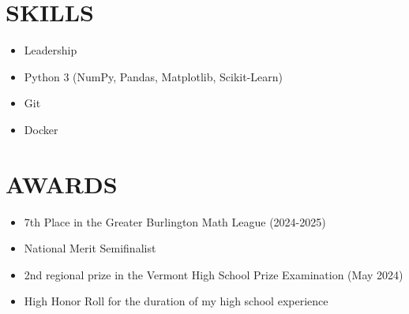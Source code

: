 \documentclass[11pt,letterpaper]{article}
\begin{document}
\vspace{1em}
\section{SKILLS}

\vspace{0.5em}
\begin{itemize}[leftmargin=*,nosep]
  \item Leadership
  \item Python 3 (NumPy, Pandas, Matplotlib, Scikit-Learn)
  \item Git
  \item Docker 
\end{itemize}

\vspace{1em}
\section{AWARDS}

\vspace{0.5em}
\begin{itemize}[leftmargin=*,nosep]
  \item 7th Place in the Greater Burlington Math League (2024-2025)
  \item National Merit Semifinalist
  \item 2nd regional prize in the Vermont High School Prize Examination (May 2024)
  \item High Honor Roll for the duration of my high school experience 
\end{itemize}
\end{document}
